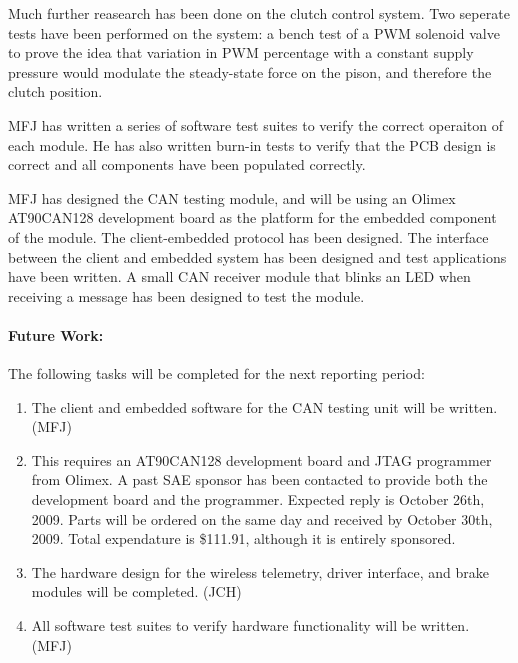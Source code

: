 \begin{enumerate} 

Much further reasearch has been done on the clutch control system. Two seperate tests have been performed on the system: a bench test of a PWM solenoid valve to prove the idea that variation in PWM percentage with a constant supply pressure would modulate the steady-state force on the pison, and therefore the clutch position. 

MFJ has written a series of software test suites to verify the correct operaiton of each module. He has also written burn-in tests to verify that the PCB design is correct and all components have been populated correctly. 

MFJ has designed the CAN testing module, and will be using an Olimex AT90CAN128 development board as the platform for the embedded component of the module. The client-embedded protocol has been designed. The interface between the client and embedded system has been designed and test applications have been written. A small CAN receiver module that blinks an LED when receiving a message has been designed to test the module.

\paragraph{Future Work:}

The following tasks will be completed for the next reporting period:

\begin{enumerate}

\item The client and embedded software for the CAN testing unit will be written. (MFJ)

\item This requires an AT90CAN128 development board and JTAG programmer from Olimex. A past SAE sponsor has been contacted to provide both the development board and the programmer. Expected reply is October 26th, 2009. Parts will be ordered on the same day and received by October 30th, 2009. Total expendature is \$111.91, although it is entirely sponsored.

\item The hardware design for the wireless telemetry, driver interface, and brake modules will be completed. (JCH)

\item All software test suites to verify hardware functionality will be written. (MFJ) 


\end{enumerate}
\end{enumerate}

